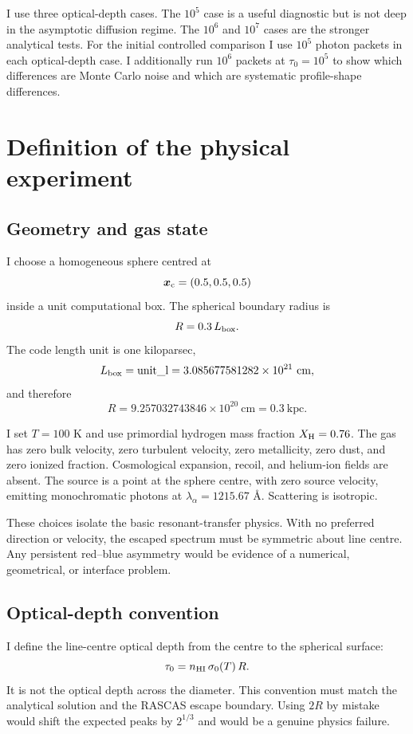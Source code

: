 \documentclass[11pt,a4paper]{article}
\newcommand{\tauzero}{\tau_0}
\newcommand{\nhi}{n_{\rm HI}}
\begin{document}
I use three optical-depth cases.  The $10^5$ case is a useful diagnostic but is
not deep in the asymptotic diffusion regime.  The $10^6$ and $10^7$ cases are
the stronger analytical tests.  For the initial controlled comparison I use
$10^5$ photon packets in each optical-depth case.  I additionally run
$10^6$ packets at $\tauzero=10^5$ to show which differences are Monte Carlo
noise and which are systematic profile-shape differences.

\section{Definition of the physical experiment}

\subsection{Geometry and gas state}

I choose a homogeneous sphere centred at
\[
\bm{x}_{\rm c}=(0.5,0.5,0.5)
\]
inside a unit computational box.  The spherical boundary radius is
\[
R=0.3\,L_{\rm box}.
\]
The code length unit is one kiloparsec,
\[
L_{\rm box}=\mathrm{unit\_l}=3.085677581282\times10^{21}\ \mathrm{cm},
\]
and therefore
\[
R=9.257032743846\times10^{20}\ \mathrm{cm}=0.3\ \mathrm{kpc}.
\]

I set $T=100$ K and use primordial hydrogen mass fraction $X_{\rm H}=0.76$.
The gas has zero bulk velocity, zero turbulent velocity, zero metallicity,
zero dust, and zero ionized fraction.  Cosmological expansion, recoil, and
helium-ion fields are absent.  The source is a point at the sphere centre,
with zero source velocity, emitting monochromatic photons at
$\lambda_\alpha=1215.67$ \AA.  Scattering is isotropic.

These choices isolate the basic resonant-transfer physics.  With no preferred
direction or velocity, the escaped spectrum must be symmetric about line
centre.  Any persistent red--blue asymmetry would be evidence of a numerical,
geometrical, or interface problem.

\subsection{Optical-depth convention}

I define the line-centre optical depth from the centre to the spherical surface:
\begin{equation}
\tauzero=\nhi\,\sigma_0(T)\,R.
\label{eq:tau}
\end{equation}
It is not the optical depth across the diameter.  This convention must match
the analytical solution and the RASCAS escape boundary.  Using $2R$ by mistake
would shift the expected peaks by $2^{1/3}$ and would be a genuine physics
failure.
\end{document}
